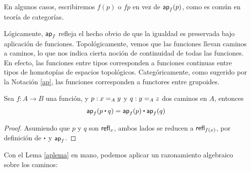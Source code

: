 \documentclass[../main.tex]{subfiles}
\begin{document}
\begin{notation}\label{ap}
  En algunos casos, escribiremos $f(p)$ o $fp$ en vez de $\apfunc f (p)$, como es com\'un en teor\'ia de categor\'ias.
\end{notation}

L\'ogicamente, $\apfunc f$ refleja el hecho obvio de que la igualdad es preservada bajo aplicaci\'on de funciones.
Topol\'ogicamente, vemos que las funciones llevan caminos a caminos, lo que nos indica cierta noci\'on de continuidad de todas las funciones. En efecto, las funciones entre tipos corresponden a funciones continuas entre tipos de homotop\'ias de espacios topol\'ogicos.
Categ\'oricamente, como sugerido por la Notaci\'on \ref{ap}, las funciones corresponden a functores entre grupoides.

\begin{lemma}\label{apct}
  Sea $f:A \to B$ una funci\'on, y $p:\id[A]{x}{y}$ y $q:\id[A]{y}{z}$ dos caminos en $A$, entonces
  \begin{equation*}
    \apfunc f (p \ct q) = \apfunc{f}(p) \ct \apfunc{f}(q)
  \end{equation*}
\end{lemma}
\begin{proof}
  Asumiendo que $p$ y $q$ son $\refl{x}$, ambos lados se reducen a $\refl{f(x)}$, por definición de $\ct$ y $\apfunc{f}$.
\end{proof}

Con el Lema \ref{aplema} en mano, podemos aplicar un razonamiento algebraico sobre los caminos:
\end{document}
